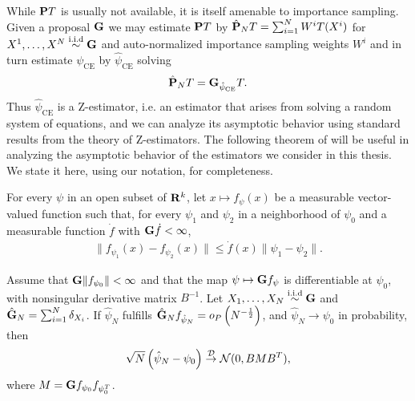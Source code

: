 While $\P T$ is usually not available, it is itself amenable to importance sampling. Given a proposal $\G$ we may estimate $\P T$ by $\hat\P_N T = \sum_{i = 1}^{N} W^{i} T(X^{i})$ for $X^{1}, \dots, X^{N} \iid \G$ and auto-normalized importance sampling weights $W^{i}$ and in turn estimate $\psi_{\text{CE}}$ by $\hat \psi_{\text{CE}}$ solving
$$
\hat \P_N T = \G_{\hpce} T.
$$
Thus $\hat\psi_{\text{CE}}$ is a Z-estimator, i.e. an estimator that arises from solving a random system of equations, and we can analyze its asymptotic behavior using standard results from the theory of Z-estimators. 
The following theorem of \citep{VanderVaart2000Asymptotic} will be useful in analyzing the asymptotic behavior of the estimators we consider in this thesis. We state it here, using our notation, for completeness.

\begin{theorem}
    \label{thm:clt_z_est_vdv}
    For every $\psi$ in an open subset of $\R^{k}$, let $x \mapsto f_{\psi}(x)$ be a measurable vector-valued function such that, for every $\psi_{1}$ and $\psi_{2}$ in a neighborhood of $\psi_{0}$ and a measurable function $\dot f$ with $\G \dot f < \infty$,
    \begin{align}
    \label{eq:clt-vdv-local-lipschitz}
    \lVert f_{\psi_{1}}(x) - f_{\psi_{2}}(x)\rVert \leq \dot f(x) \lVert \psi_{1} - \psi_{2}\rVert \tag{LL}.
    \end{align}

    Assume that $\G \lVert f_{\psi_{0}}\rVert < \infty$ and that the map $\psi \mapsto \G f_{\psi}$ is differentiable at $\psi_{0}$, with nonsingular derivative matrix $B^{-1}$. Let $X_{1}, \dots, X_{N} \iid \G$ and $\hat \G_{N} = \sum_{i = 1}^{N} \delta_{X_{i}}$. If $\hat\psi_{N}$ fulfills $\hat\G_{N} f_{\hat\psi_{N}} = o_{P} \left( N^{-\frac{1}{2}} \right)$, and $\hat\psi_{N} \to \psi_{0}$ in probability, then
    \begin{align}
        \label{eq:clt-vdv}
        \sqrt{N} \left( \hat\psi_{N} - \psi_{0} \right) \Dto \mathcal N(0, BMB^{T}),
    \end{align}
    where $M = \G f_{\psi_{0}} f_{\psi_{0}^{T}}$.
\end{theorem}

